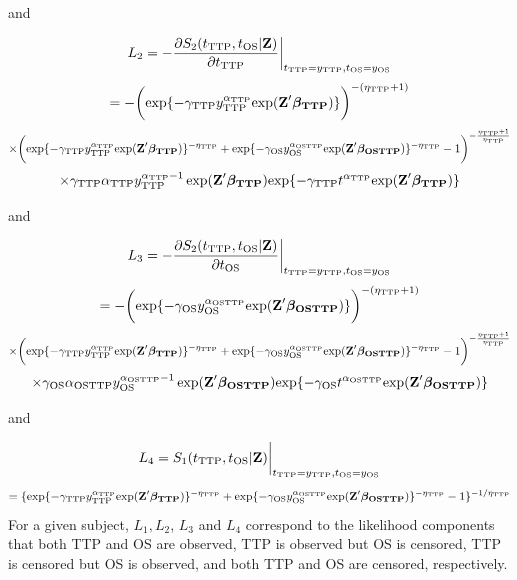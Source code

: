 \documentclass[12pt]{article}
\begin{document}
and

$$
L_2=-\frac{\partial S_2(t_{\rm TTP}, t_{\rm OS}|\textbf{Z})}{\partial t_{\rm TTP}}\bigg|_{t_{\rm TTP}=y_{\rm TTP},t_{\rm OS}=y_{\rm OS}}
$$
$$
=-\bigg(\mathrm{exp}\{-\gamma_{\rm TTP} y_{\rm TTP}^{\alpha_{\rm TTP}}
\mathrm{exp}(\textbf{Z}' \boldsymbol{\beta_{\rm TTP}} )\}\bigg)^{-(\eta_{\rm TTP}+1)}
$$
$$
\times \bigg(\mathrm{exp}\{-\gamma_{\rm TTP} y_{\rm TTP}^{\alpha_{\rm TTP}}
\mathrm{exp}(\textbf{Z}' \boldsymbol{\beta_{\rm TTP}} )\}^{-\eta_{\rm TTP}}+\mathrm{exp}\{-\gamma_{\rm OS} y_{\rm OS}^{\alpha_{\rm OSTTP}}
\mathrm{exp}(\textbf{Z}' \boldsymbol{\beta_{\rm OSTTP}} )\}^{-\eta_{\rm TTP}}-1\bigg)^{-\frac{\eta_{\rm TTP}+1}{\eta_{\rm TTP}}}
$$
$$
\times \gamma_{\rm TTP} \alpha_{\rm TTP} y_{\rm TTP}^{{\alpha_{\rm TTP} -1}} \exp(\textbf{Z}' \boldsymbol{\beta_{\rm TTP}}) \mathrm{exp}\{-\gamma_{\rm TTP} t^{\alpha_{\rm TTP}}
\mathrm{exp}(\textbf{Z}' \boldsymbol{\beta_{\rm TTP}} )\}
$$

and

$$
L_3=-\frac{\partial S_2(t_{\rm TTP}, t_{\rm OS}|\textbf{Z})}{\partial t_{\rm OS}}\bigg|_{t_{\rm TTP}=y_{\rm TTP},t_{\rm OS}=y_{\rm OS}}
$$
$$
=-\bigg(\mathrm{exp}\{-\gamma_{\rm OS} y_{\rm OS}^{\alpha_{\rm OSTTP}}
\mathrm{exp}(\textbf{Z}' \boldsymbol{\beta_{\rm OSTTP}} )\}\bigg)^{-(\eta_{\rm TTP}+1)}
$$
$$
\times \bigg(\mathrm{exp}\{-\gamma_{\rm TTP} y_{\rm TTP}^{\alpha_{\rm TTP}}
\mathrm{exp}(\textbf{Z}' \boldsymbol{\beta_{\rm TTP}} )\}^{-\eta_{\rm TTP}}+\mathrm{exp}\{-\gamma_{\rm OS} y_{\rm OS}^{\alpha_{\rm OSTTP}}
\mathrm{exp}(\textbf{Z}' \boldsymbol{\beta_{\rm OSTTP}} )\}^{-\eta_{\rm TTP}}-1\bigg)^{-\frac{\eta_{\rm TTP}+1}{\eta_{\rm TTP}}}
$$
$$
\times \gamma_{\rm OS} \alpha_{\rm OSTTP} y_{\rm OS}^{{\alpha_{\rm OSTTP} -1}} \exp(\textbf{Z}' \boldsymbol{\beta_{\rm OSTTP}}) \mathrm{exp}\{-\gamma_{\rm OS} t^{\alpha_{\rm OSTTP}}
\mathrm{exp}(\textbf{Z}' \boldsymbol{\beta_{\rm OSTTP}} )\}
$$

and

$$
L_4=S_1(t_{\rm TTP}, t_{\rm OS}|\textbf{Z})\bigg|_{t_{\rm TTP}=y_{\rm TTP},t_{\rm OS}=y_{\rm OS}}
$$
$$
=\{\mathrm{exp}\{-\gamma_{\rm TTP} y_{\rm TTP}^{\alpha_{\rm TTP}}
\mathrm{exp}(\textbf{Z}' \boldsymbol{\beta_{\rm TTP}} )\}^{-\eta_{\rm TTP}}
+\mathrm{exp}\{-\gamma_{\rm OS} y_{\rm OS}^{\alpha_{\rm OSTTP}}
\mathrm{exp}(\textbf{Z}' \boldsymbol{\beta_{\rm OSTTP}} )\}^{-\eta_{\rm TTP}}-1\}^{-1/\eta_{\rm TTP}}
$$
For a given subject, $L_1, L_2$,  $L_3$ and $L_4$ correspond to the likelihood components that both TTP and OS are observed, TTP is observed but OS is censored, TTP is censored but OS is observed, and both TTP and OS are censored, respectively.
\end{document}
